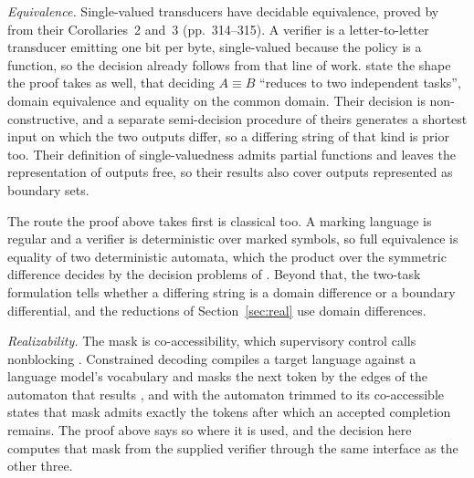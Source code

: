 \documentclass[11pt,a4paper]{article}
\theoremstyle{definition}
\theoremstyle{plain}
\begin{document}
\emph{Equivalence.} Single-valued transducers have decidable equivalence, proved by \citet{blattner1977single} from
their Corollaries~2 and~3 (pp.~314--315). A verifier is a letter-to-letter transducer emitting one bit per byte,
single-valued because the policy is a function, so the decision already follows from that line of work.
\citet{veanes2012sft} state the shape the proof takes as well, that deciding $A \equiv B$ ``reduces to two independent
tasks'', domain equivalence and equality on the common domain. Their decision is non-constructive, and a separate
semi-decision procedure of theirs generates a shortest input on which the two outputs differ, so a differing string of
that kind is prior too. Their definition of single-valuedness admits partial functions and leaves the representation of
outputs free, so their results also cover outputs represented as boundary sets.

The route the proof above takes first is classical too. A marking language is regular and a verifier is deterministic
over marked symbols, so full equivalence is equality of two deterministic automata, which the product over the symmetric
difference decides by the decision problems of \citet[Theorem~10 and Corollary~10.1]{rabin1959finite}. Beyond that, the
two-task formulation tells whether a differing string is a domain difference or a boundary differential, and the
reductions of Section~\ref{sec:real} use domain differences.

\emph{Realizability.} The mask is co-accessibility, which supervisory control calls nonblocking
\citep[Section~6]{ramadge1987supervisory}. Constrained decoding compiles a target language against a language model's
vocabulary and masks the next token by the edges of the automaton that results \citep{koo2024automata}, and with the
automaton trimmed to its co-accessible states that mask admits exactly the tokens after which an accepted completion
remains. The proof above says so where it is used, and the decision here computes that mask from the supplied verifier
through the same interface as the other three.
\end{document}
